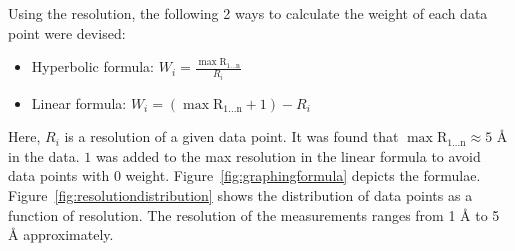 \documentclass[11pt]{article}
\begin{document}
Using the resolution, the following 2 ways to calculate the weight of each data point were devised:
\begin{itemize}
\item Hyperbolic formula: $  W_i = \frac{ \mathrm{\max{R_{1 ...  n}}}}{R_i}  $
\item Linear formula: $ W_i = (\mathrm{\max{R_{1 ...  n}}} + 1) - R_i $
\end{itemize}

Here, $R_i$ is a resolution of a given data point.
It was found that $\mathrm{\max{R_{1 ...  n}}} \approx 5$ \si{\angstrom} in the data.
$1$ was added to the max resolution in the linear formula to avoid data points with $0$ weight.
Figure~\ref{fig:graphingformula} depicts the formulae.
Figure~\ref{fig:resolutiondistribution} shows the distribution of data points as a function of resolution.
The resolution of the measurements ranges from 1 \si{\angstrom} to 5 \si{\angstrom} approximately.
\end{document}
